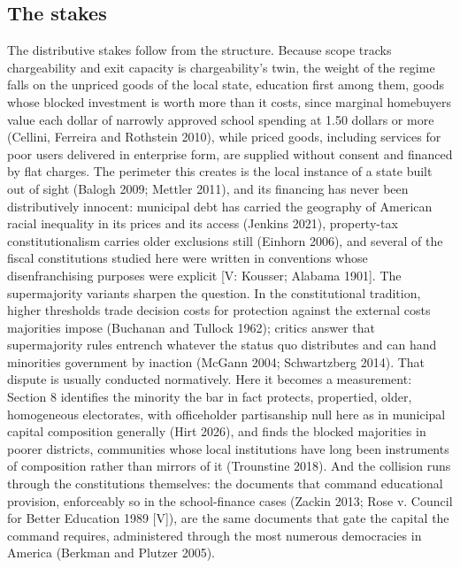 \subsection{The stakes}
The distributive stakes follow from the structure. Because scope tracks chargeability and exit capacity is chargeability's twin, the weight of the regime falls on the unpriced goods of the local state, education first among them, goods whose blocked investment is worth more than it costs, since marginal homebuyers value each dollar of narrowly approved school spending at 1.50 dollars or more (Cellini, Ferreira and Rothstein 2010), while priced goods, including services for poor users delivered in enterprise form, are supplied without consent and financed by flat charges. The perimeter this creates is the local instance of a state built out of sight (Balogh 2009; Mettler 2011), and its financing has never been distributively innocent: municipal debt has carried the geography of American racial inequality in its prices and its access (Jenkins 2021), property-tax constitutionalism carries older exclusions still (Einhorn 2006), and several of the fiscal constitutions studied here were written in conventions whose disenfranchising purposes were explicit [V: Kousser; Alabama 1901]. The supermajority variants sharpen the question. In the constitutional tradition, higher thresholds trade decision costs for protection against the external costs majorities impose (Buchanan and Tullock 1962); critics answer that supermajority rules entrench whatever the status quo distributes and can hand minorities government by inaction (McGann 2004; Schwartzberg 2014). That dispute is usually conducted normatively. Here it becomes a measurement: Section 8 identifies the minority the bar in fact protects, propertied, older, homogeneous electorates, with officeholder partisanship null here as in municipal capital composition generally (Hirt 2026), and finds the blocked majorities in poorer districts, communities whose local institutions have long been instruments of composition rather than mirrors of it (Trounstine 2018). And the collision runs through the constitutions themselves: the documents that command educational provision, enforceably so in the school-finance cases (Zackin 2013; Rose v. Council for Better Education 1989 [V]), are the same documents that gate the capital the command requires, administered through the most numerous democracies in America (Berkman and Plutzer 2005).

